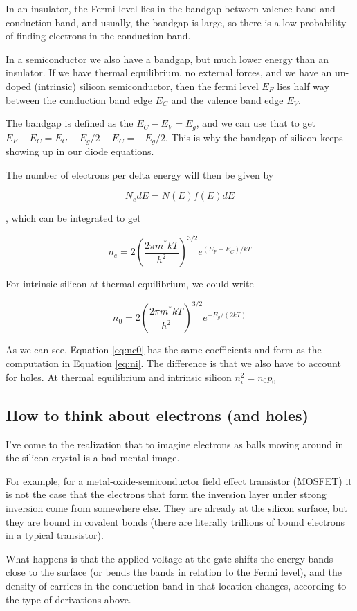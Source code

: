In an insulator, the Fermi level lies in the bandgap between valence
band and conduction band, and usually, the bandgap is large, so there is
a low probability of finding electrons in the conduction band.

In a semiconductor we also have a bandgap, but much lower energy than an
insulator. If we have thermal equilibrium, no external forces, and we
have an un-doped (intrinsic) silicon semiconductor, then the fermi level
\(E_F\) lies half way between the conduction band edge \(E_C\) and the
valence band edge \(E_V\).

The bandgap is defined as the \(E_C - E_V = E_g\), and we can use that
to get \(E_F - E_C = E_C - E_g/2 - E_C= -E_g/2\). This is why the
bandgap of silicon keeps showing up in our diode equations.

The number of electrons per delta energy will then be given by

\[N_e dE = N(E)f(E)dE\]

, which can be integrated to get

\[
n_e = 2\left( \frac{2 \pi m^\ast k T}{h^2}\right)^{3/2} e^{(E_F - E_C)/kT}
\]

For intrinsic silicon at thermal equilibrium, we could write

\[
n_0 = 2\left( \frac{2 \pi m^\ast k T}{h^2}\right)^{3/2} e^{-E_g/(2kT)}
\tag{3}
\label{eq:nc0}
\]

As we can see, Equation \eqref{eq:nc0} has the same coefficients and
form as the computation in Equation \eqref{eq:ni}. The difference is
that we also have to account for holes. At thermal equilibrium and
intrinsic silicon \(n_i^2 = n_0 p_0\)

\subsection{How to think about electrons (and
holes)}\label{how-to-think-about-electrons-and-holes}

I've come to the realization that to imagine electrons as balls moving
around in the silicon crystal is a bad mental image.

For example, for a metal-oxide-semiconductor field effect transistor
(MOSFET) it is not the case that the electrons that form the inversion
layer under strong inversion come from somewhere else. They are already
at the silicon surface, but they are bound in covalent bonds (there are
literally trillions of bound electrons in a typical transistor).

What happens is that the applied voltage at the gate shifts the energy
bands close to the surface (or bends the bands in relation to the Fermi
level), and the density of carriers in the conduction band in that
location changes, according to the type of derivations above.

